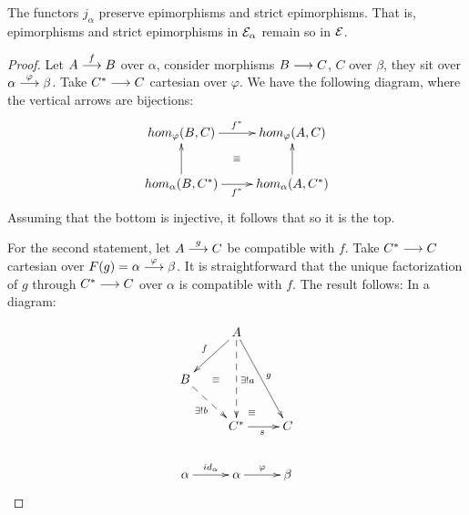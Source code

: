 \begin{lemma}\label{casi epis}
The functors $j_\alpha$ preserve epimorphisms and strict epimorphisms. That is, epimorphisms and strict epimorphisms in $\mathcal{E}_\alpha$ remain so in 
$\mathcal{E}$.
\end{lemma}
\begin{proof}
Let $A \overset {f} {\longrightarrow} B$ over $\alpha$,  consider morphisms $B \overset {} {\longrightarrow} C$, $C$ over 
$\beta$, they sit over  $\alpha \overset {\varphi} {\longrightarrow} \beta$. Take  
 $C^* \overset {} {\longrightarrow} C$ cartesian over $\varphi$. We have the following diagram, where the vertical arrows are bijections:
$$
\xymatrix{hom_\varphi(B,C) \ar[r]^{f^*} \ar@{}[dr]|\equiv & hom_\varphi(A,C) \\
		  hom_\alpha(B,C^*) \ar[u] \ar[r]_{f^*} & hom_\alpha(A,C^*) \ar[u]}
$$
Assuming that the bottom is injective, it follows that so it is the top.

\vspace{1ex}

For the second statement, let ${A \overset {g} {\longrightarrow} C}$ be compatible with $f$. Take 
${C^* \overset {} {\longrightarrow} C}$ cartesian over ${F(g) = \alpha \overset {\varphi} {\longrightarrow} \beta}$. It is straightforward that the unique factorization of $g$ through 
${C^* \overset {} {\longrightarrow} C}$ over $\alpha$ is compatible with $f$. The result follows: In a diagram:

$$
\xymatrix 
    {
   & A \ar [dl]_{f}  
       \ar [ddr] ^{g}  
       \ar  @{-->} [dd]^{\exists ! a}  
   \\
     B \ar @{-->} [dr]_{\exists ! b}  
	&  \ar @{}[l] |(.4){\equiv} 
	& 
   \\
    & C^* \ar[r]_{s}  
          \ar@{}[ru] | (.3){\equiv} 
    & C  
   \\
	  \alpha \ar [r]^{id_\alpha}  
	& \alpha \ar [r]^{\varphi}  
	&  \beta 
	}
$$
\end{proof}

